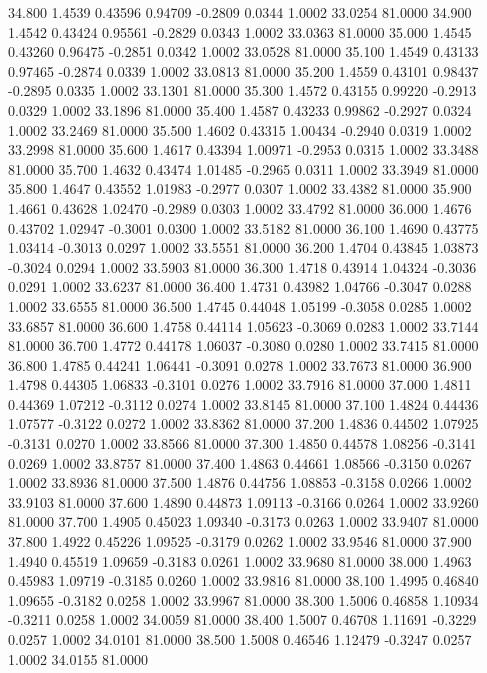   34.800   1.4539   0.43596   0.94709  -0.2809   0.0344   1.0002  33.0254  81.0000
  34.900   1.4542   0.43424   0.95561  -0.2829   0.0343   1.0002  33.0363  81.0000
  35.000   1.4545   0.43260   0.96475  -0.2851   0.0342   1.0002  33.0528  81.0000
  35.100   1.4549   0.43133   0.97465  -0.2874   0.0339   1.0002  33.0813  81.0000
  35.200   1.4559   0.43101   0.98437  -0.2895   0.0335   1.0002  33.1301  81.0000
  35.300   1.4572   0.43155   0.99220  -0.2913   0.0329   1.0002  33.1896  81.0000
  35.400   1.4587   0.43233   0.99862  -0.2927   0.0324   1.0002  33.2469  81.0000
  35.500   1.4602   0.43315   1.00434  -0.2940   0.0319   1.0002  33.2998  81.0000
  35.600   1.4617   0.43394   1.00971  -0.2953   0.0315   1.0002  33.3488  81.0000
  35.700   1.4632   0.43474   1.01485  -0.2965   0.0311   1.0002  33.3949  81.0000
  35.800   1.4647   0.43552   1.01983  -0.2977   0.0307   1.0002  33.4382  81.0000
  35.900   1.4661   0.43628   1.02470  -0.2989   0.0303   1.0002  33.4792  81.0000
  36.000   1.4676   0.43702   1.02947  -0.3001   0.0300   1.0002  33.5182  81.0000
  36.100   1.4690   0.43775   1.03414  -0.3013   0.0297   1.0002  33.5551  81.0000
  36.200   1.4704   0.43845   1.03873  -0.3024   0.0294   1.0002  33.5903  81.0000
  36.300   1.4718   0.43914   1.04324  -0.3036   0.0291   1.0002  33.6237  81.0000
  36.400   1.4731   0.43982   1.04766  -0.3047   0.0288   1.0002  33.6555  81.0000
  36.500   1.4745   0.44048   1.05199  -0.3058   0.0285   1.0002  33.6857  81.0000
  36.600   1.4758   0.44114   1.05623  -0.3069   0.0283   1.0002  33.7144  81.0000
  36.700   1.4772   0.44178   1.06037  -0.3080   0.0280   1.0002  33.7415  81.0000
  36.800   1.4785   0.44241   1.06441  -0.3091   0.0278   1.0002  33.7673  81.0000
  36.900   1.4798   0.44305   1.06833  -0.3101   0.0276   1.0002  33.7916  81.0000
  37.000   1.4811   0.44369   1.07212  -0.3112   0.0274   1.0002  33.8145  81.0000
  37.100   1.4824   0.44436   1.07577  -0.3122   0.0272   1.0002  33.8362  81.0000
  37.200   1.4836   0.44502   1.07925  -0.3131   0.0270   1.0002  33.8566  81.0000
  37.300   1.4850   0.44578   1.08256  -0.3141   0.0269   1.0002  33.8757  81.0000
  37.400   1.4863   0.44661   1.08566  -0.3150   0.0267   1.0002  33.8936  81.0000
  37.500   1.4876   0.44756   1.08853  -0.3158   0.0266   1.0002  33.9103  81.0000
  37.600   1.4890   0.44873   1.09113  -0.3166   0.0264   1.0002  33.9260  81.0000
  37.700   1.4905   0.45023   1.09340  -0.3173   0.0263   1.0002  33.9407  81.0000
  37.800   1.4922   0.45226   1.09525  -0.3179   0.0262   1.0002  33.9546  81.0000
  37.900   1.4940   0.45519   1.09659  -0.3183   0.0261   1.0002  33.9680  81.0000
  38.000   1.4963   0.45983   1.09719  -0.3185   0.0260   1.0002  33.9816  81.0000
  38.100   1.4995   0.46840   1.09655  -0.3182   0.0258   1.0002  33.9967  81.0000
  38.300   1.5006   0.46858   1.10934  -0.3211   0.0258   1.0002  34.0059  81.0000
  38.400   1.5007   0.46708   1.11691  -0.3229   0.0257   1.0002  34.0101  81.0000
  38.500   1.5008   0.46546   1.12479  -0.3247   0.0257   1.0002  34.0155  81.0000
